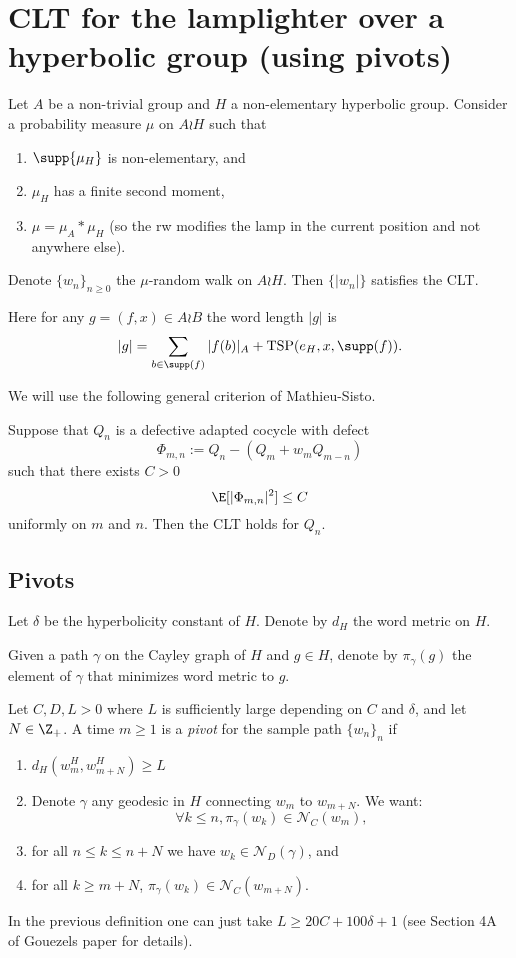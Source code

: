 \section{CLT for the lamplighter over a hyperbolic group (using pivots)}
\begin{thm}
    Let $A$ be a non-trivial group and $H$ a non-elementary hyperbolic group. Consider a probability measure $\mu$ on $A\wr H$ such that
    \begin{enumerate}
    \item $\supp{\mu_H}$ is non-elementary, and
    \item $\mu_H$ has a finite second moment,
    \item $\mu=\mu_A*\mu_H$ (so the rw modifies the lamp in the current position and not anywhere else).
    \end{enumerate}
    Denote $\{w_n\}_{n\ge 0}$ the $\mu$-random walk on $A\wr H$. Then $\{|w_n|\}$ satisfies the CLT.
\end{thm}

Here for any $g=(f,x)\in A\wr B$ the word length $|g|$ is
\[
|g|= \sum_{b\in\supp(f)}|f(b)|_{A} + \mathrm{TSP}(e_H,x,\supp(f)).
\]

We will use the following general criterion of Mathieu-Sisto.

\begin{thm}[\cite{MS20}] \label{thm:generalCLT}
    Suppose that $Q_n$ is a defective adapted cocycle with defect
    \[
       \Phi_{m,n} := Q_n - (Q_m + w_m Q_{m-n})
    \]
such that  there exists $C>0$  \[
       \E[|\Phi_{m,n}|^2] \le C
    \]
uniformly on $m$ and $n$. Then the CLT holds for $Q_n$.
\end{thm}
\subsection{Pivots}
Let $\delta$ be the hyperbolicity constant of $H$. Denote by $d_H$ the word metric on $H$.

Given a path $\gamma$ on the Cayley graph of $H$ and $g\in H$, denote by $\pi_{\gamma}(g)$ the element of $\gamma$ that minimizes word metric to $g$.

\begin{defin}
        Let $C,D,L>0$ where $L$ is sufficiently large depending on $C$ and $\delta$, and let $N\in \Z_{+}$. A time $m\ge 1$ is a \emph{pivot} for the sample path $\{w_n\}_{n}$ if   
        \begin{enumerate}
            \item $d_{H}(w^{H}_m,w^{H}_{m+N})\ge L$
            \item Denote $\gamma$ any geodesic in $H$ connecting $w_m$ to $w_{m+N}.$ We want: 
\[ \forall k\le n, \pi_{\gamma}(w_k)\in \mathcal{N}_{C}(w_m),
\]
\item for all $n\le k\le n+N$ we have $w_k\in \mathcal{N}_{D}(\gamma)$, and
\item for all $k\ge m+N$, $\pi_{\gamma}(w_k)\in \mathcal{N}_{C}(w_{m+N})$.
        \end{enumerate}
\end{defin}
In the previous definition one can just take $L\ge 20C+100\delta+1$ (see Section 4A of Gouezels paper for details).

